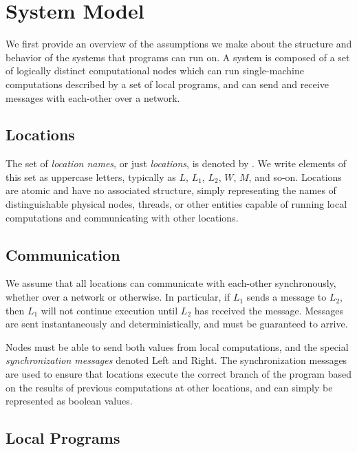 \section{System Model}
\label{sec:system_model}

We first provide an overview of the assumptions we make about the structure and behavior of the systems that \langname{} programs can run on.
A system is composed of a set of logically distinct computational nodes which can run single-machine computations described by a set of local programs, and can send and receive messages with each-other over a network.

\subsection{Locations}
\label{sec:locations}

The set of \emph{location names}, or just \emph{locations}, is denoted by \Locations.
We write elements of this set as uppercase letters, typically as $L$, $L_1$, $L_2$, $W$, $M$, and so-on.
Locations are atomic and have no associated structure, simply representing the names of distinguishable physical nodes, threads, or other entities capable of running local computations and communicating with other locations.

\subsection{Communication}
\label{sec:communication}

We assume that all locations can communicate with each-other synchronously, whether over a network or otherwise.
In particular, if $L_1$ sends a message to $L_2$, then $L_1$ will not continue execution until $L_2$ has received the message.
Messages are sent instantaneously and deterministically, and must be guaranteed to arrive.

Nodes must be able to send both values from local computations, and the special \emph{synchronization messages} denoted \textsf{Left} and \textsf{Right}.
The synchronization messages are used to ensure that locations execute the correct branch of the program based on the results of previous computations at other locations, and can simply be represented as boolean values.

\subsection{Local Programs}
\label{sec:local-programs}

